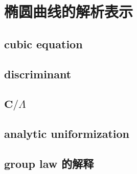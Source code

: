 \section{椭圆曲线的解析表示}
\label{b3:sec:2204}


\subsection{cubic equation}
\label{b3:subsec:220401}

\subsection{discriminant}
\label{b3:subsec:220402}

\subsection{\texorpdfstring{\(\mathbf C/\Lambda\)}{/}}
\label{b3:subsec:220403}

\subsection{analytic uniformization}
\label{b3:subsec:220404}

\subsection{group law 的解释}
\label{b3:subsec:220405}


